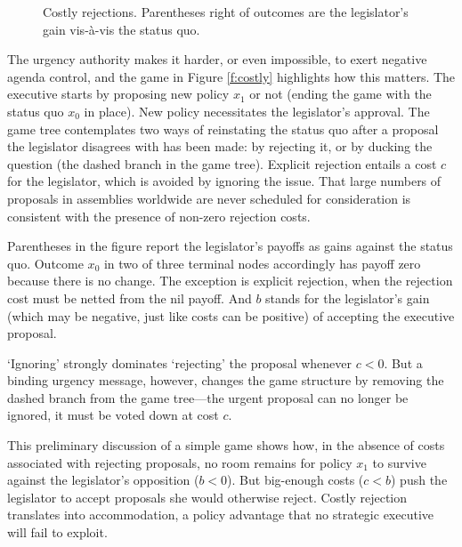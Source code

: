 \documentclass[letter,12pt]{article}
\begin{document}
\begin{figure}
  \caption{Costly rejections. Parentheses right of outcomes are the legislator's gain vis-\`a-vis the status quo.}
\end{figure}

The urgency authority makes it harder, or even impossible, to exert negative agenda control, and the game in Figure \ref{f:costly} highlights how this matters. The executive starts by proposing new policy $x_1$ or not (ending the game with the status quo $x_0$ in place). New policy necessitates the legislator's approval. The game tree contemplates two ways of reinstating the status quo after a proposal the legislator disagrees with has been made: by rejecting it, or by ducking the question (the dashed branch in the game tree). Explicit rejection entails a cost $c$ for the legislator, which is avoided by ignoring the issue. That large numbers of proposals in assemblies worldwide are never scheduled for consideration is consistent with the presence of non-zero rejection costs. 

Parentheses in the figure report the legislator's payoffs as gains against the status quo. Outcome $x_0$ in two of three terminal nodes accordingly has payoff zero because there is no change. The exception is explicit rejection, when the rejection cost must be netted from the nil payoff. And $b$ stands for the legislator's gain (which may be negative, just like costs can be positive) of accepting the executive proposal. 

`Ignoring' strongly dominates `rejecting' the proposal whenever $c<0$. But a binding urgency message, however, changes the game structure by removing the dashed branch from the game tree---the urgent proposal can no longer be ignored, it must be voted down at cost $c$. 

This preliminary discussion of a simple game shows how, in the absence of costs associated with rejecting proposals, no room remains for policy $x_1$ to survive against the legislator's opposition ($b<0$). But big-enough costs ($c<b$) push the legislator to accept proposals she would otherwise reject. Costly rejection translates into accommodation, a policy advantage that no strategic executive will fail to exploit. 
\end{document}
